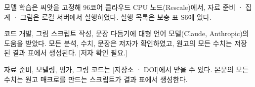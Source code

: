 모델 학습은 씨앗을 고정해 96코어 클라우드 CPU 노드(Rescale)에서, 자료 준비 · 집계 · 그림은 로컬 서버에서 실행하였다. 실행 목록은 보충 표 S6에 있다.

코드 개발, 그림 스크립트 작성, 문장 다듬기에 대형 언어 모델(Claude, Anthropic)의 도움을 받았다. 모든 분석, 수치, 문장은 저자가 확인하였고, 원고의 모든 수치는 저장된 결과 표에서 생성된다. [저자 확인 필요.]

자료 준비, 모델링, 평가, 그림 코드는 [저장소 · DOI]에서 받을 수 있다. 본문의 모든 수치는 원고 매크로를 만드는 스크립트가 결과 표에서 생성한다.
